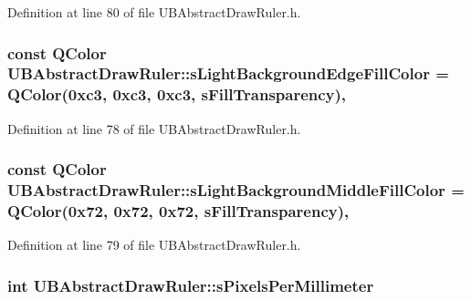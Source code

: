 Definition at line 80 of file U\-B\-Abstract\-Draw\-Ruler.\-h.

\hypertarget{class_u_b_abstract_draw_ruler_a23289fe8e275562b9abb4f3264cbfb40}{
\subsubsection[{s\-Light\-Background\-Edge\-Fill\-Color}]{\setlength{\rightskip}{0pt plus 5cm}const Q\-Color U\-B\-Abstract\-Draw\-Ruler\-::s\-Light\-Background\-Edge\-Fill\-Color = Q\-Color(0xc3, 0xc3, 0xc3, s\-Fill\-Transparency)\hspace{0.3cm}{\ttfamily [static]}, {\ttfamily [protected]}}}\label{d0/de1/class_u_b_abstract_draw_ruler_a23289fe8e275562b9abb4f3264cbfb40}


Definition at line 78 of file U\-B\-Abstract\-Draw\-Ruler.\-h.

\hypertarget{class_u_b_abstract_draw_ruler_ad4dcc64c13c7d491f73fbe26d3fee521}{
\subsubsection[{s\-Light\-Background\-Middle\-Fill\-Color}]{\setlength{\rightskip}{0pt plus 5cm}const Q\-Color U\-B\-Abstract\-Draw\-Ruler\-::s\-Light\-Background\-Middle\-Fill\-Color = Q\-Color(0x72, 0x72, 0x72, s\-Fill\-Transparency)\hspace{0.3cm}{\ttfamily [static]}, {\ttfamily [protected]}}}\label{d0/de1/class_u_b_abstract_draw_ruler_ad4dcc64c13c7d491f73fbe26d3fee521}


Definition at line 79 of file U\-B\-Abstract\-Draw\-Ruler.\-h.

\hypertarget{class_u_b_abstract_draw_ruler_a55740bf0a8ca5f716c90287e721fbe89}{
\subsubsection[{s\-Pixels\-Per\-Millimeter}]{\setlength{\rightskip}{0pt plus 5cm}int U\-B\-Abstract\-Draw\-Ruler\-::s\-Pixels\-Per\-Millimeter\hspace{0.3cm}{\ttfamily [protected]}}}\label{d0/de1/class_u_b_abstract_draw_ruler_a55740bf0a8ca5f716c90287e721fbe89}


